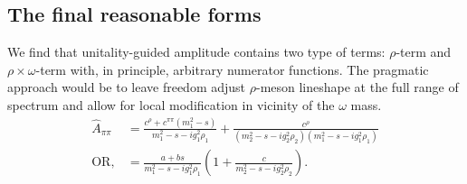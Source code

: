 \documentclass[aps,prd,superscriptaddress,onecolumn,nofootinbib,preprintnumbers,notitlepage]{revtex4-1}
\begin{document}
\subsection{The final reasonable forms}
We find that unitality-guided amplitude contains two type of terms:
$\rho$-term and $\rho\times\omega$-term with, in principle, arbitrary numerator functions.
The pragmatic approach would be to leave freedom adjust $\rho$-meson lineshape
at the full range of spectrum and allow for local modification in vicinity of the $\omega$ mass.
\begin{align}
  \hat{A}_{\pi\pi}
  & = \frac{c^{\rho} + c^{\pi\pi}(m_1^2-s)}{m_1^2-s-ig_1^2\rho_1}
   + \frac{c^{\rho}}{(m_2^2-s-ig_2^2\rho_2)(m_1^2-s-ig_1^2\rho_1)}\\
  \mathrm{OR,} & =
  \frac{a + bs}{m_1^2-s-ig_1^2\rho_1}\left(
    1+ \frac{c}{m_2^2-s-ig_2^2\rho_2}
  \right).
\end{align}




\end{document}
